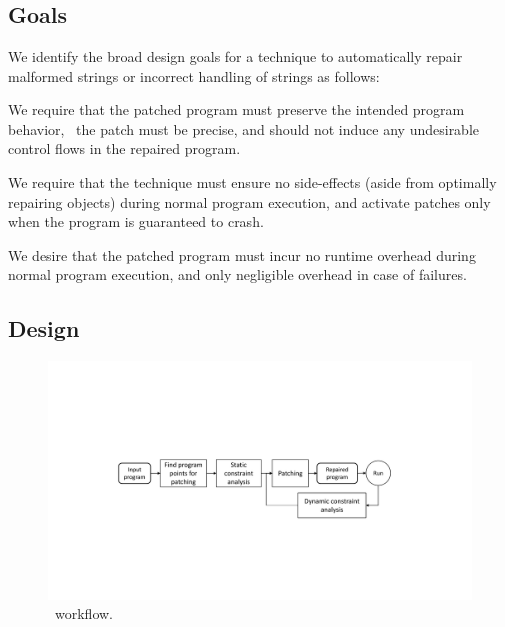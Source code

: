 \section{\tool}
\label{sec:design}

\subsection{Goals}
\label{sec:tool:goals}

We identify the broad design goals for a technique to automatically repair
malformed strings or incorrect handling of strings as follows:


 We require that the patched program must
preserve the intended program behavior, \ie\ the patch must be precise, and
should not induce any undesirable control flows in the repaired program.

 We require that the technique
must ensure no side-effects (aside from optimally repairing objects) during
normal program execution, and activate patches only when the program is
guaranteed to crash.

 We desire that the patched program must
incur no runtime overhead during normal program execution, and only negligible
overhead in case of failures.

\subsection{Design}
\label{sec:tool:design}

\begin{figure}[t]
\centering
\includegraphics[scale=.38]{images/NewDesignDiagram.pdf}
\caption{\tool\ workflow.}
\label{fig:overallDesign}
\end{figure}

